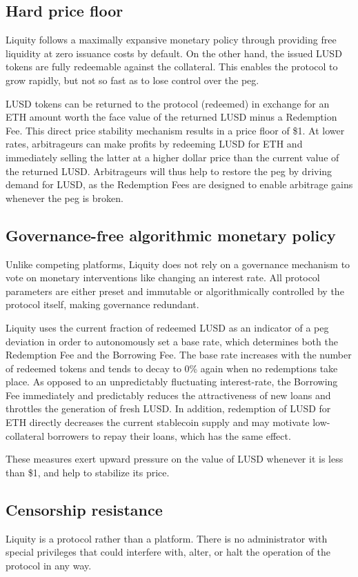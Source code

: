 \documentclass{article}
\begin{document}
\subsection{Hard price floor}
Liquity follows a maximally expansive monetary policy through providing free liquidity at zero issuance costs by default. On the other hand, the issued LUSD tokens are fully redeemable against the collateral. This enables the protocol to grow rapidly, but not so fast as to lose control over the peg.

LUSD tokens can be returned to the protocol (redeemed) in exchange for an ETH amount worth the face value of the returned LUSD minus a Redemption Fee. This direct price stability mechanism results in a price floor of \$1. At lower rates, arbitrageurs can make profits by redeeming LUSD for ETH and immediately selling the latter at a higher dollar price than the current value of the returned LUSD. Arbitrageurs will thus help to restore the peg by driving demand for LUSD, as the Redemption Fees are designed to enable arbitrage gains whenever the peg is broken.

\subsection{Governance-free algorithmic monetary policy}
Unlike competing platforms, Liquity does not rely on a governance mechanism to vote on monetary interventions like changing an interest rate. All protocol parameters are either preset and immutable or algorithmically controlled by the protocol itself, making governance redundant.

Liquity uses the current fraction of redeemed LUSD as an indicator of a peg deviation in order to autonomously set a base rate, which determines both the Redemption Fee and the Borrowing Fee. The base rate increases with the number of redeemed tokens and tends to decay to 0\% again when no redemptions take place. As opposed to an unpredictably fluctuating interest-rate, the Borrowing Fee immediately and predictably reduces the attractiveness of new loans and throttles the generation of fresh LUSD. In addition, redemption of LUSD for ETH directly decreases the current stablecoin supply and may motivate low-collateral borrowers to repay their loans, which has the same effect. 

These measures exert upward pressure on the value of LUSD whenever it is less than \$1, and help to stabilize its price.

\subsection{Censorship resistance}
Liquity is a protocol rather than a platform. There is no administrator with special privileges that could interfere with, alter, or halt the operation of the protocol in any way.
\end{document}
